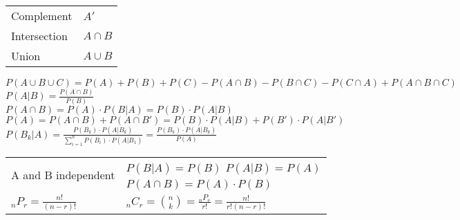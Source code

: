 \documentclass[10pt,landscape]{article}
\begin{document}
\raggedright
\footnotesize
\begin{multicols*}{3}


\setlength{\premulticols}{1pt}
\setlength{\postmulticols}{1pt}
\setlength{\multicolsep}{1pt}
\setlength{\columnsep}{2pt}




\newlength{\MyLen}

\begin{tabular}{@{}p{\the\MyLen}%
		@{}p{\linewidth-\the\MyLen}@{}}
	Complement & $A'$\\
	Intersection & $A\cap B$\\
	Union & $A\cup B$\\
\end{tabular}
   
$P(A\cup B\cup C)=P(A)+P(B)+P(C)-P(A\cap B)-P(B\cap C)-P(C\cap A)+P(A\cap B\cap C)$\\
$P(A|B)=\frac{P(A\cap B)}{P(B)}$\\
$P(A\cap B)=P(A)\cdot P(B|A)=P(B)\cdot P(A|B)$\\
$P(A)=P(A\cap B)+P(A\cap B')=P(B)\cdot P(A|B)+P(B')\cdot P(A|B')$\\
$P(B_k|A)=\frac{P(B_k)\cdot P(A|B_k)}{\displaystyle\sum_{i=1}^{n}P(B_i)\cdot P(A|B_1)}=\frac{P(B_k)\cdot P(A|B_k)}{P(A)}$\\
\begin{tabular}{@{}p{\the\MyLen}%
		@{}p{\linewidth-\the\MyLen}@{}}
		\multirow{2}{*}{A and B independent} & $P(B|A)=P(B)$ $P(A|B)=P(A)$ \\ &$P(A\cap B)=P(A)\cdot P(B)$\\
		$_nP_r=\frac{n!}{(n-r)!}$ & $_nC_r=\binom{n}{k}=\frac{_nP_r}{r!}=\frac{n!}{r!(n-r)!}$\\
\end{tabular}


\end{multicols*}
\end{document}
